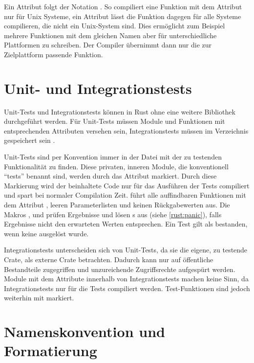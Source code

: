 Ein Attribut folgt der Notation . So compiliert eine Funktion mit dem Attribut  nur für Unix Systeme, ein Attribut  lässt die Funktion dagegen für alle Systeme compilieren, die nicht ein Unix-System sind.
Dies ermöglicht zum Beispiel mehrere Funktionen mit dem gleichen Namen aber für unterschiedliche Plattformen zu schreiben.
Der Compiler übernimmt dann nur die zur Zielplattform passende Funktion.

\section{Unit- und Integrationstests}
\label{rust:tests}

Unit-Tests und Integrationstests können in Rust ohne eine weitere Bibliothek durchgeführt werden.
Für Unit-Tests müssen Module und Funktionen mit entsprechenden Attributen versehen sein, Integrationstests müssen im Verzeichnis  gespeichert sein \cite{rust:book:tests}.

Unit-Tests sind per Konvention immer in der Datei mit der zu testenden Funktionalität zu finden.
Diese privaten, inneren Module, die konventionell \enquote{tests} benannt sind, werden durch das Attribut  markiert.
Durch diese Markierung wird der beinhaltete Code nur für das Ausführen der Tests compiliert und spart bei normaler Compilation Zeit.
 führt alle auffindbaren Funktionen mit dem Attribut \rustcinline{#[test]}, leeren Parameterlisten und keinen Rückgabewerten aus.
Die Makros ,  und  prüfen Ergebnisse und lösen s aus (siehe \autoref{rust:panic}), falls Ergebnisse nicht den erwarteten Werten entsprechen.
Ein Test gilt als bestanden, wenn keine  ausgelöst wurde.

Integrationstests unterscheiden sich von Unit-Tests, da sie die eigene, zu testende Crate, als externe Crate betrachten.
Dadurch kann nur auf öffentliche Bestandteile zugegriffen und unzureichende Zugriffsrechte aufgespürt werden.
Module mit dem Attribute  innerhalb von Integrationstests machen keine Sinn, da Integrationstests nur für die Tests compiliert werden.
Test-Funktionen sind jedoch weiterhin mit \rustcinline{#[test]} markiert.


\section{Namenskonvention und Formatierung}
\label{rust:styleguide}

